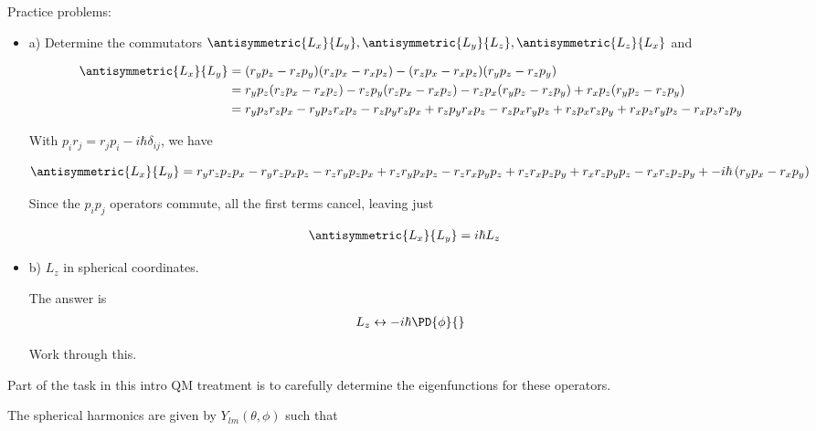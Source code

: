Practice problems:
\begin{itemize}
\item a) Determine the commutators $\antisymmetric{L_x}{L_y}, \antisymmetric{L_y}{L_z}, \antisymmetric{L_z}{L_x}$ and

\begin{align*}
\antisymmetric{L_x}{L_y}
&=
(r_y p_z -r_z p_y)
(r_z p_x -r_x p_z)
-
(r_z p_x -r_x p_z)
(r_y p_z -r_z p_y) \\
&=
r_y p_z (r_z p_x -r_x p_z)
-r_z p_y (r_z p_x -r_x p_z)
- r_z p_x (r_y p_z -r_z p_y)
+ r_x p_z (r_y p_z -r_z p_y) \\
&=
r_y p_z r_z p_x
-r_y p_z r_x p_z
-r_z p_y r_z p_x
+r_z p_y r_x p_z
- r_z p_x r_y p_z
+ r_z p_x r_z p_y
+ r_x p_z r_y p_z
- r_x p_z r_z p_y \\
\end{align*}

With $p_i r_j = r_j p_i - i \hbar \delta_{ij}$, we have

\begin{dmath*}
\antisymmetric{L_x}{L_y}
=
r_y r_z p_z p_x
-r_y r_z p_x p_z
-r_z r_y p_z p_x
+r_z r_y p_x p_z
- r_z r_x p_y p_z
+ r_z r_x p_z p_y
+ r_x r_z p_y p_z
- r_x r_z p_z p_y 
+
-i \hbar
\left(
r_y p_x
- r_x p_y
\right)
\end{dmath*}

Since the $p_i p_j$ operators commute, all the first terms cancel, leaving just

\begin{align*}
\antisymmetric{L_x}{L_y}
&=i \hbar L_z
\end{align*}


\item b) $L_z$ in spherical coordinates.

The answer is
\begin{align}\label{eqn:PHY356Foct19:1003}
L_z \leftrightarrow -i \hbar \PD{\phi}{}
\end{align}

Work through this.
\end{itemize}

Part of the task in this intro QM treatment is to carefully determine the eigenfunctions for these operators.

The spherical harmonics are given by $Y_{lm}(\theta, \phi)$ such that

